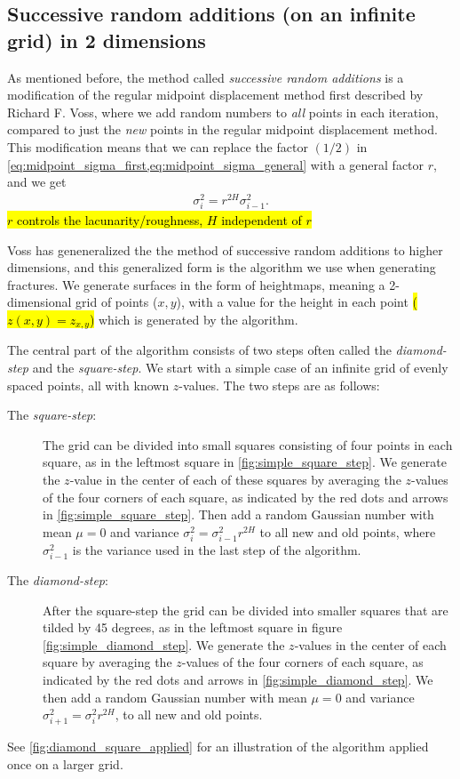 \subsection{Successive random additions (on an infinite grid) in 2 dimensions}
As mentioned before, the method called \emph{successive random additions} is a modification of the regular midpoint displacement method first described by Richard F. Voss\cite{voss1985random}, where we add random numbers to \emph{all} points in each iteration, compared to just the \emph{new} points in the regular midpoint displacement method. This modification means that we can replace the factor $(1/2)$ in \cref{eq:midpoint_sigma_first,eq:midpoint_sigma_general} with a general factor $r$, and we get
\begin{align*}
    \sigma_i^2 = r^{2H}\sigma^2_{i-1}.
\end{align*}
\hl{$r$ controls the lacunarity/roughness, $H$ independent of $r$}

Voss has geneneralized the the method of successive random additions to higher dimensions\cite{voss1985random}, and this generalized form is the algorithm we use when generating fractures. We generate surfaces in the form of heightmaps, meaning a 2-dimensional grid of points ({$x,y$}), with a value for the height in each point \hl{($z(x,y) = z_{x,y}$)} which is generated by the algorithm.

The central part of the algorithm consists of two steps often called the \emph{diamond-step} and the \emph{square-step}. We start with a simple case of an infinite grid of evenly spaced points, all with known $z$-values. The two steps are as follows:
\begin{description}
    \item[The \emph{square-step}:] The grid can be divided into small squares consisting of four points in each square, as in the leftmost square in \cref{fig:simple_square_step}. We generate the $z$-value in the center of each of these squares by averaging the $z$-values of the four corners of each square, as indicated by the red dots and arrows in \cref{fig:simple_square_step}. Then add a random Gaussian number with mean $\mu = 0$ and variance $\sigma_i^2 = \sigma_{i-1}^2r^{2H}$ to all new and old points, where $\sigma_{i-1}^2$ is the variance used in the last step of the algorithm.
    \label{enum:test}
    
    \item[The \emph{diamond-step}:] After the square-step the grid can be divided into smaller squares that are tilded by 45 degrees, as in the leftmost square in figure \cref{fig:simple_diamond_step}. We generate the $z$-values in the center of each square by averaging the $z$-values of the four corners of each square, as indicated by the red dots and arrows in \cref{fig:simple_diamond_step}. We then add a random Gaussian number with mean $\mu = 0$ and variance $\sigma_{i+1}^2 = \sigma_i^2r^{2H}$, to all new and old points. 
\end{description}
See \cref{fig:diamond_square_applied} for an illustration of the algorithm applied once on a larger grid. 

